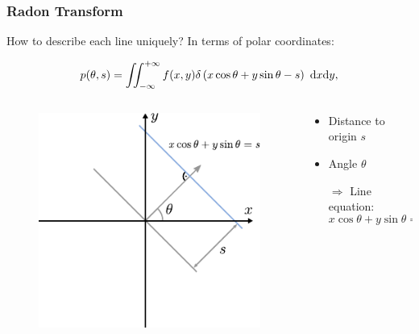 \begin{frame}
	\frametitle{Radon Transform}
	How to describe each line uniquely? In terms of polar coordinates:

	\begin{equation}
		\label{eqn:ct_radon_2}
		p(\theta, s) =\iint_{-\infty}^{+\infty} f(x,y) \delta\left(x \cos \theta + y \sin \theta - s\right) \ \textnormal{d}x\textnormal{d}y,
	\end{equation}

	\begin{columns}[c, onlytextwidth]
		\begin{column}{0.5\textwidth}
			\begin{figure}[tbp]
				\centering
				\includegraphics[height=0.6\textheight]{images/radon_1}%
				\label{fig:ct_radon_1}
			\end{figure}
		\end{column}\begin{column}{0.5\textwidth}
			\begin{itemize}
				\setlength\itemsep{0.3cm}
				\item Distance to origin $s$
				\item Angle $\theta$
				\item[$\Rightarrow$] Line equation:
				      \begin{equation}
					      x \cos{\theta} + y \sin{\theta} = s
				      \end{equation}
			\end{itemize}
		\end{column}
	\end{columns}

\end{frame}


